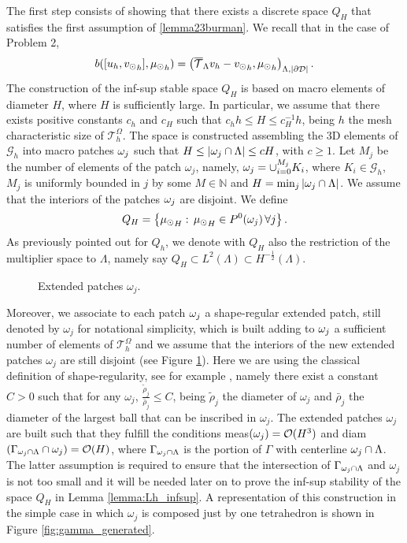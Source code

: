 The first step consists of showing
that there exists a discrete space $Q_H$ that satisfies the first assumption of \ref{lemma23burman}. 
We recall that in the case of Problem 2, 
\begin{equation*}
b([u_h, {v_{\odot}}_h], {\mu_{\odot}}_h) = \left({\overline{\mathcal{T}}_\Lambda} v_h - {v_{\odot}}_h, {\mu_{\odot}}_h\right)_{\Lambda,|\partial\mathcal{D}|}.
\end{equation*}
The construction of the inf-sup stable space $Q_H$ is based on macro elements of diameter $H$, where $H$ is sufficiently large. In particular, we assume that there exists positive constants $c_h$ and $c_H$ such that $c_h h\leq H \leq c_H^{-1}h$, being $h$ the mesh characteristic size of $\mathcal{T}_h^\Omega$. The space is constructed assembling the 3D elements of $\mathcal{G}_h$ into macro patches $ \omega _j $ such that $H \leq |\omega _j\cap \Lambda|\leq cH$, with $c\geq 1$. Let $M_j$ be the number of elements of the patch $\omega_j$, namely, $\omega _j=\cup _{i=0}^{M_j} K_i$, where $K_i \in \mathcal{G}_h$, $M_j$ is uniformly bounded in $j$ by some $M\in \mathbb{N}$ and $H=\min_{j}|\omega _j\cap \Lambda|$. We assume that the interiors of the patches $\omega _j$ are  disjoint. We define 
\begin{equation*}
Q_H=\left\{{\mu_{\odot} }_H: \, {\mu_{\odot} }_H\in P^0(\omega _j)\, \forall j \right\}.
\end{equation*}
As previously pointed out for $Q_h$, we denote with $Q_H$ also the restriction of the multiplier space to $\Lambda$, namely say $Q_H \subset L^2(\Lambda) \subset H^{-\frac12}(\Lambda)$.

\begin{figure}\label{fig:patch}
\center

\caption{Extended patches $\omega_j$.}
\end{figure}

Moreover, we associate to each patch $\omega _j$ a shape-regular extended patch, still denoted by $\omega_j$ for notational simplicity, which is built adding to $\omega _j$ a sufficient number of elements of $\mathcal{T}_h^{\Omega}$ and we assume that the interiors of the new extended patches $\omega _j$ are still disjoint (see Figure \ref{fig:patch}). Here we are using the classical definition of shape-regularity, see for example \cite{MR2050138}, namely there exist a constant $C>0$ such that for any $\omega_j$, $\frac{\tilde{\rho}_j}{\bar{\rho}_j}\leq C$, being $\tilde{\rho}_j$ the diameter of $\omega_j$ and $\bar{\rho}_j$ the diameter of the largest ball that can be inscribed in $\omega_j$. The extended patches $\omega _j$ are built such that they fulfill the conditions meas$(\omega _j)=\mathcal{O}(H^3)$ and diam$(\Gamma_{\omega _j\cap \Lambda}\cap \omega_j)=\mathcal{O}(H)$, where $\Gamma_{\omega _j\cap \Lambda}$ is the portion of $\Gamma$ with centerline $\omega _j\cap \Lambda$. The latter assumption is required to ensure that the intersection of $\Gamma_{\omega _j\cap \Lambda}$ and $\omega_j$ is not too small and it will be needed later on to prove the inf-sup stability of the space $Q_H$ in Lemma \ref{lemma:Lh_infsup}. A representation of this construction in the simple case in which $\omega _j$ is composed just by one tetrahedron is shown in Figure \ref{fig:gamma_generated}.


